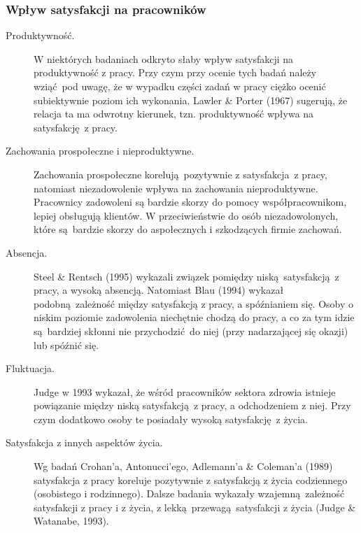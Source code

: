 \subsubsection{Wpływ satysfakcji na pracowników}
\begin{description}
\item[Produktywność.] W niektórych badaniach odkryto słaby wpływ satysfakcji na produktywność z pracy. Przy czym przy ocenie tych badań należy wziąć pod uwagę, że w wypadku części zadań w pracy ciężko ocenić subiektywnie poziom ich wykonania. Lawler \& Porter (1967) sugerują, że relacja ta ma odwrotny kierunek, tzn. produktywność wpływa na satysfakcję z pracy.
\item[Zachowania prospołeczne i nieproduktywne.] Zachowania prospołeczne korelują pozytywnie z satysfakcja z pracy, natomiast niezadowolenie wpływa na zachowania nieproduktywne. Pracownicy zadowoleni są bardzie skorzy do pomocy współpracownikom, lepiej obsługują klientów. W przeciwieństwie do osób niezadowolonych, które są bardzie skorzy do aspołecznych i szkodzących firmie zachowań.
\item[Absencja.] Steel \& Rentsch (1995) wykazali związek pomiędzy niską satysfakcją z pracy, a wysoką absencją. Natomiast Blau (1994) wykazał podobną zależność między satysfakcją z pracy, a spóźnianiem się. Osoby o niskim poziomie zadowolenia niechętnie chodzą do pracy, a co za tym idzie są bardziej skłonni nie przychodzić do niej (przy nadarzającej się okazji) lub spóźnić się.
\item[Fluktuacja.] Judge w 1993 wykazał, że wśród pracowników sektora zdrowia istnieje powiązanie między niską satysfakcją z pracy, a odchodzeniem z niej. Przy czym dodatkowo osoby te posiadały wysoką satysfakcję z życia.
\item[Satysfakcja z innych aspektów życia.] Wg badań Crohan'a, Antonucci'ego, Adlemann'a \& Coleman'a (1989) satysfakcja z pracy koreluje pozytywnie z satysfakcją z życia codziennego (osobistego i rodzinnego). Dalsze badania wykazały wzajemną zależność satysfakcji z pracy i z życia, z lekką przewagą satysfakcji z życia (Judge \& Watanabe, 1993).
\end{description}
